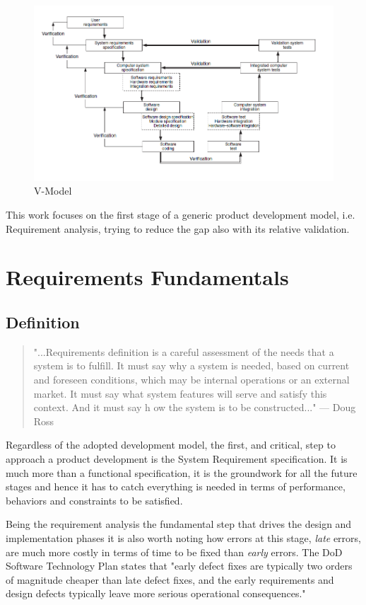 \begin{figure}[!h]
	\centering 
     \includegraphics[width=\textwidth]{Figs/vmodel.png} 
     \caption{V-Model} 
     \label{fig:vmodel} 
\end{figure} 

This work focuses on the first stage of a generic product development model, i.e. Requirement analysis, trying to reduce the gap also with its relative validation.

\section{Requirements Fundamentals}
\subsection{Definition}
\begin{quote}
"...Requirements definition is a careful assessment of the needs that a system is to fulfill. It must say why a
system is needed, based on current and foreseen conditions, which may be internal operations or an external market. It must say what system features will serve and satisfy this context. And it must say h ow the
system is to be constructed..." — Doug Ross \citep{ross1977structured}
\end{quote}
Regardless of the adopted development model, the first, and critical, step to approach a product development is the System Requirement specification. It is much more than a functional specification, it is the groundwork for all the future stages and hence it has to catch everything is needed in terms of performance, behaviors and constraints to be satisfied. 
\par Being the requirement analysis the fundamental step that drives the design and implementation phases it is also worth noting how errors at this stage, \textit{late} errors, are much more costly in terms of time to be fixed than \textit{early} errors. The DoD Software Technology Plan \citep{DoD91} states that "early defect fixes are typically two orders of magnitude cheaper than late defect fixes, and the early requirements and design defects typically leave more serious operational consequences."

